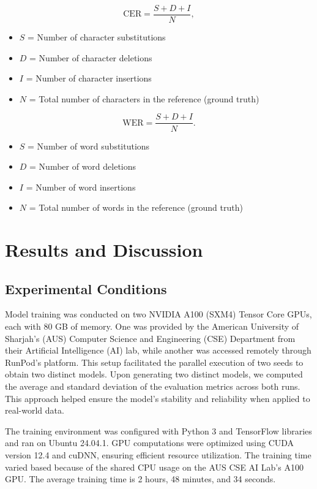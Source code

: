 \documentclass[conference]{IEEEtran}
\newcounter{customsubsubsection} %
\let\oldsubsection\subsection
\renewcommand{\subsection}[1]{%
  \oldsubsection{#1}%
  \setcounter{customsubsubsection}{0}%
}
\begin{document}
\begin{equation}
  \text{CER} = \frac{S + D + I}{N},
\end{equation}

\begin{itemize}
\item \( S \) = Number of character substitutions
\item \( D \) = Number of character deletions
\item \( I \) = Number of character insertions
\item \( N \) = Total number of characters in the reference (ground truth)
\end{itemize}

\begin{equation}
  \text{WER} = \frac{S + D + I}{N}.
\end{equation}

\begin{itemize}
\item \( S \) = Number of word substitutions
\item \( D \) = Number of word deletions
\item \( I \) = Number of word insertions
\item \( N \) = Total number of words in the reference (ground truth)
\end{itemize}

\section{Results and Discussion}
\subsection{Experimental Conditions}

Model training was conducted on two NVIDIA A100 (SXM4) Tensor Core GPUs, each with 80 GB of memory. One was provided by the American University of Sharjah's (AUS) Computer Science and Engineering (CSE) Department from their Artificial Intelligence (AI) lab, while another was accessed remotely through RunPod's platform. This setup facilitated the parallel execution of two seeds to obtain two distinct models. Upon generating two distinct models, we computed the average and standard deviation of the evaluation metrics across both runs. This approach helped ensure the model’s stability and reliability when applied to real-world data.

The training environment was configured with Python 3 and TensorFlow libraries and ran on Ubuntu 24.04.1. GPU computations were optimized using CUDA version 12.4 and cuDNN, ensuring efficient resource utilization. The training time varied based because of the shared CPU usage on the AUS CSE AI Lab's A100 GPU. The average training time is 2 hours, 48 minutes, and 34 seconds.
\end{document}
